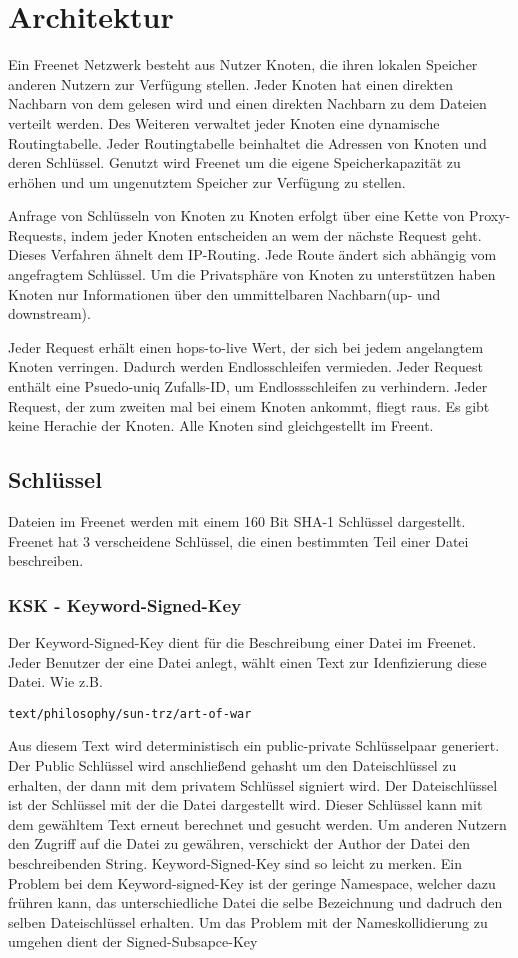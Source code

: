 \section{Architektur}
Ein Freenet Netzwerk besteht aus Nutzer Knoten, die ihren lokalen Speicher
anderen Nutzern zur Verfügung stellen. Jeder Knoten hat einen direkten Nachbarn
von dem gelesen wird und einen direkten Nachbarn zu dem Dateien verteilt
werden. Des Weiteren verwaltet jeder Knoten eine dynamische Routingtabelle.
Jeder Routingtabelle beinhaltet die Adressen von Knoten und deren Schlüssel.
Genutzt wird Freenet um die eigene Speicherkapazität zu erhöhen und um
ungenutztem Speicher zur Verfügung zu stellen.

Anfrage von Schlüsseln von Knoten zu Knoten erfolgt über eine Kette von
Proxy-Requests, indem jeder Knoten entscheiden an wem der nächste Request geht.
Dieses Verfahren ähnelt dem IP-Routing. Jede Route ändert sich abhängig vom
angefragtem Schlüssel.
Um die Privatsphäre von Knoten zu unterstützen haben Knoten nur Informationen
über den ummittelbaren Nachbarn(up- und downstream).

Jeder Request erhält einen hops-to-live Wert, der sich bei jedem angelangtem
Knoten verringen. Dadurch werden Endlosschleifen vermieden.
Jeder Request enthält eine Psuedo-uniq Zufalls-ID, um Endlossschleifen zu
verhindern. Jeder Request, der zum zweiten mal bei einem Knoten ankommt, fliegt
raus. Es gibt keine Herachie der Knoten. Alle Knoten sind gleichgestellt
im Freent.

\subsection{Schlüssel}
Dateien im Freenet werden mit einem 160 Bit SHA-1 Schlüssel dargestellt.
Freenet hat 3 verscheidene Schlüssel, die einen bestimmten Teil einer Datei
beschreiben.

\subsubsection{KSK - Keyword-Signed-Key}
Der Keyword-Signed-Key dient für die Beschreibung einer Datei im Freenet. Jeder
Benutzer der eine Datei anlegt, wählt einen Text zur Idenfizierung diese
Datei. Wie z.B.
\begin{lstlisting}
text/philosophy/sun-trz/art-of-war
\end{lstlisting}
Aus diesem Text wird deterministisch ein public-private Schlüsselpaar
generiert. Der Public Schlüssel wird anschließend gehasht um den Dateischlüssel
zu erhalten, der dann mit dem privatem Schlüssel signiert wird.  Der
Dateischlüssel ist der Schlüssel mit der die Datei dargestellt wird. Dieser
Schlüssel kann mit dem gewähltem Text erneut berechnet und gesucht werden.  Um
anderen Nutzern den Zugriff auf die Datei zu gewähren, verschickt der Author
der Datei den beschreibenden String. Keyword-Signed-Key sind so leicht zu
merken.  Ein Problem bei dem Keyword-signed-Key ist der geringe Namespace,
welcher dazu frühren kann, das unterschiedliche Datei die selbe Bezeichnung und
dadruch den selben Dateischlüssel erhalten. Um das Problem mit der
Nameskollidierung zu umgehen dient der Signed-Subsapce-Key

